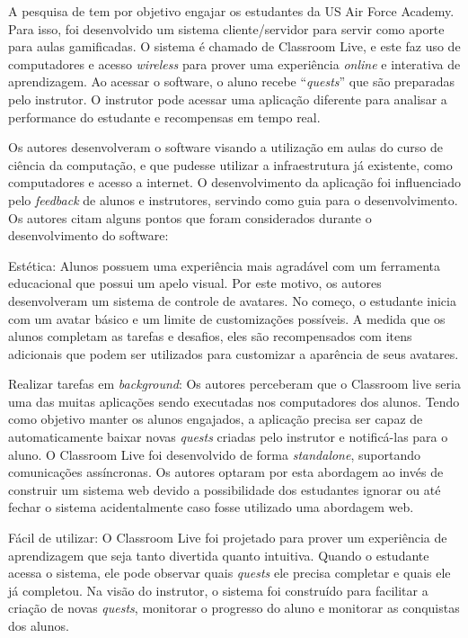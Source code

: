 \documentclass[
	12pt,				%
	oneside,			%
	a4paper,			%
	english,			%
	french,				%
	spanish,			%
	brazil,				%
	]{abntex2}
\begin{document}
A pesquisa de \citet{de2013classroom} tem por objetivo engajar os estudantes da US Air Force Academy. Para isso, foi desenvolvido um sistema cliente/servidor para servir como aporte para aulas gamificadas. O sistema é chamado de Classroom Live, e este faz uso de computadores e acesso \textit{wireless} para prover uma experiência \textit{online} e interativa de aprendizagem. Ao acessar o software, o aluno recebe “\textit{quests}” que são preparadas pelo instrutor. O instrutor pode acessar uma aplicação diferente para analisar a performance do estudante e recompensas em tempo real.

Os autores desenvolveram o software visando a utilização em aulas do curso de ciência da computação, e que pudesse utilizar a infraestrutura já existente, como computadores e acesso a internet. O desenvolvimento da aplicação foi influenciado pelo \textit{feedback} de alunos e instrutores, servindo como guia para o desenvolvimento. Os autores citam alguns pontos que foram considerados durante o desenvolvimento do software:

Estética: Alunos possuem uma experiência mais agradável com um ferramenta educacional que possui um apelo visual. Por este motivo, os autores desenvolveram um sistema de controle de avatares. No começo, o estudante inicia com um avatar básico e um limite de customizações possíveis. A medida que os alunos completam as tarefas e desafios, eles são recompensados com itens adicionais que podem ser utilizados para customizar a aparência de seus avatares.

Realizar tarefas em \textit{background}: Os autores perceberam que o Classroom live seria uma das muitas aplicações sendo executadas nos computadores dos alunos. Tendo como objetivo manter os alunos engajados, a aplicação precisa ser capaz de automaticamente baixar novas \textit{quests} criadas pelo instrutor e notificá-las para o aluno. O Classroom Live foi desenvolvido de forma \textit{standalone}, suportando comunicações assíncronas. Os autores optaram por esta abordagem ao invés de construir um sistema web devido a possibilidade dos estudantes ignorar ou até fechar o sistema acidentalmente caso fosse utilizado uma abordagem web.

Fácil de utilizar: O Classroom Live foi projetado para prover um experiência de aprendizagem que seja tanto divertida quanto intuitiva. Quando o estudante acessa o sistema, ele pode observar quais \textit{quests} ele precisa completar e quais ele já completou. Na visão do instrutor, o sistema foi construído para facilitar a criação de novas \textit{quests}, monitorar o progresso do aluno e monitorar as conquistas dos alunos.
\end{document}
